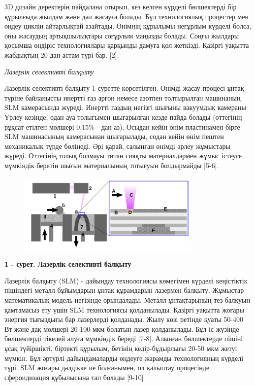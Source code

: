 3D дизайн деректерін пайдалана отырып, кез келген күрделі бөлшектерді
бір құрылғыда жылдам және дәл жасауға болады. Бұл технологиялық
процестер мен өңдеу циклін айтарлықтай азайтады. Өнімнің құрылымы
неғұрлым күрделі болса, оны жасаудың артықшылықтары соғұрлым маңызды
болады. Соңғы жылдары қосымша өндіріс технологиялары қарқынды дамуға қол
жеткізді. Қазіргі уақытта жабдықтың 20 дан астам түрі бар. {[}2{]}.

\emph{Лазерлік селективті балқыту}

Лазерлік селективті балқыту 1-суретте көрсетілген. Өнімді жасау процесі
ұнтақ түріне байланысты инертті газ аргон немесе азотпен толтырылған
машинаның SLM камерасында жүреді. Инертті газдың негізгі шығыны
вакуумдық камераны Үрлеу кезінде, одан ауа толығымен шығарылған кезде
пайда болады (оттегінің рұқсат етілген мөлшері 0,15\% - дан аз). Осыдан
кейін өнім пластинамен бірге SLM машинасының камерасынан шығарылады,
содан кейін өнім пештен механикалық түрде бөлінеді. Әрі қарай, салынған
өнімді әрлеу жұмыстары жүреді. Оттегінің толық болмауы титан сияқты
материалдармен жұмыс істеуге мүмкіндік беретін шығын материалының
тотығуын болдырмайды {[}5-6{]}.


\begin{figure}[H]
	\centering
	\includegraphics[width=0.8\textwidth]{media/ict2/image187}
	\caption*{}
\end{figure}


{\bfseries 1 - сурет. Лазерлік селективті балқыту}

Лазерлік балқыту (SLM) - дайындау технологиясы көмегімен күрделі
кеңістіктік пішіндегі металл бұйымдарын ұнтақ құрамдарын лазермен
балқыту. Жұмыстар математикалық модель негізінде орындалады. Металл
ұнтақтарының тез балқуын қамтамасыз ету үшін SLM технологиясы
қолданылады. Қазіргі уақытта жоғары энергия тығыздығы бар лазерлерді
қолданады. Жылу көзі ретінде қуаты 50-400 Вт және дақ мөлшері 20-100 мкм
болатын лазер қолданылады. Бұл іс жүзінде бөлшектерді тікелей алуға
мүмкіндік береді {[}7-8{]}. Алынған бөлшектерде пішіні ұсақ түйіршікті,
біртекті құрылым, бетінің кедір-бұдырлығы 20-50 мкм жетуі мүмкін. Бұл
әртүрлі дайындамаларды өңдеуге жарамды технологияның күрделі түрі. SLM
жоғары дәлдікке ие болғанымен, ол қалыптау процесінде сфероидизация
құбылысына тап болады {[}9-10{]}

